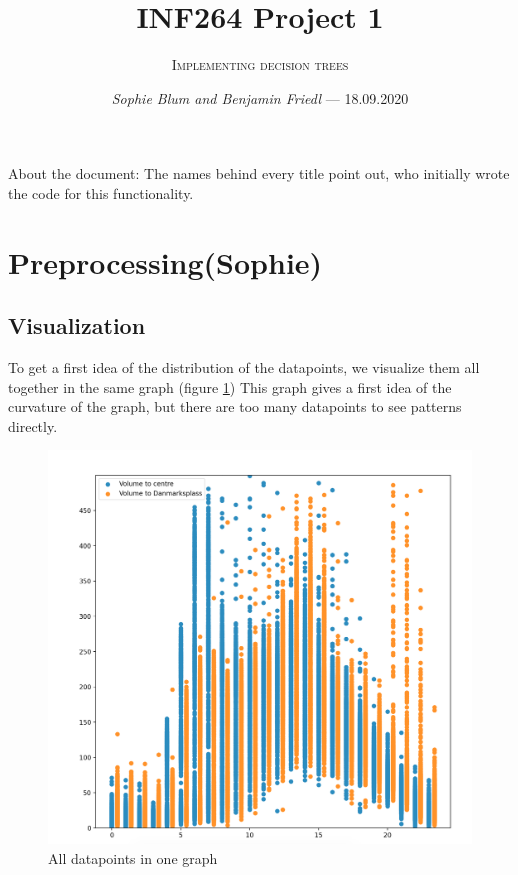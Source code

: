 \documentclass[12pt,a4paper]{scrartcl}		%
\newcommand\svthema{INF264 Project 1}
\newcommand\svperson{Sophie Blum and Benjamin Friedl}
\newcommand\svdatum{18.09.2020}
\newcommand\lvname{Implementing decision trees}
\begin{document}
\title{ \svthema}
\author{\textsc{\lvname}}
\date{ \small \textsl{\svperson} --- \svdatum }
\maketitle

\abstract
About the document:
The names behind every title point out, who initially wrote the code for this functionality. 

\section{Preprocessing(Sophie)}
\subsection{Visualization}
To get a first idea of the distribution of the datapoints, we visualize them all together in the same graph (figure \ref{fig::all})
This graph gives a first idea of the curvature of the graph, but there are too many datapoints to see patterns directly.
\begin{figure}[h]
    \centering
    \includegraphics[scale = 0.45]{vis_all.png}
    \caption{All datapoints in one graph}
    \label{fig::all}
\end{figure}
\end{document}
